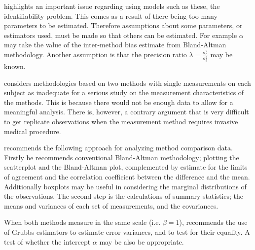 \documentclass[12pt, a4paper]{report}
\begin{document}
\citet{DunnSEME} highlights an important issue regarding using
models such as these, the identifiability problem. This comes as a
result of there being too many parameters to be estimated.
Therefore assumptions about some parameters, or estimators used,
must be made so that others can be estimated. For example $\alpha$
may take the value of the inter-method bias estimate from
Bland-Altman methodology. Another assumption is that the precision
ratio $\lambda=\frac{\sigma^{2}_{\epsilon}}{\sigma^{2}_{\delta}}$
may be known.


\citet{DunnSEME} considers methodologies based on two methods with single measurements on each subject as inadequate for a serious study
on the measurement characteristics of the methods. This is because there would not be enough data to allow for a meaningful analysis.
There is, however, a contrary argument that is very difficult to get replicate
observations when the measurement method requires invasive medical procedure.

\citet{DunnSEME} recommends the following approach for analyzing
method comparison data. Firstly he recommends conventional
Bland-Altman methodology; plotting the scatterplot and the
Bland-Altman plot, complemented by estimate for the limits of
agreement and the correlation coefficient between the difference
and the mean. Additionally boxplots may be useful in considering
the marginal distributions of the observations. The second step is
the calculations of summary statistics; the means and variances of
each set of measurements, and the covariances.

When both methods measure in the same scale (i.e. $\beta = 1$),
\citet{DunnSEME} recommends the use of Grubbs estimators to
estimate error variances, and to test for their equality. A test
of whether the intercept $\alpha$ may be also be appropriate.



\end{document}
